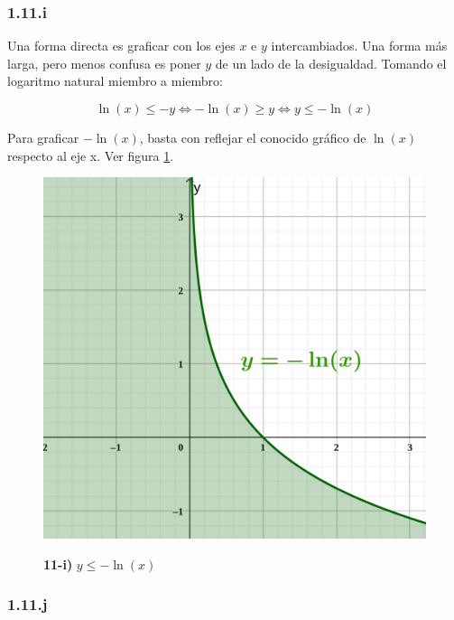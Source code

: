 \documentclass{article}
\begin{document}
\subsubsection*{1.11.i}
\label{subsubsec:1.11.i}

Una forma directa es graficar con los ejes $x$ e $y$ intercambiados. Una forma más larga, pero menos confusa es poner $y$ de un lado de la desigualdad. Tomando el logaritmo natural miembro a miembro:

\begin{equation}
\ln (x) \leq -y \Leftrightarrow -\ln(x) \geq y \Leftrightarrow y \leq -\ln(x)
\end{equation}

Para graficar $-\ln(x)$, basta con reflejar el conocido gráfico de $\ln(x)$ respecto al eje x. Ver figura \ref{fig:1-11-i}.

\begin{figure}[ht]
\caption{\textbf{11-i)} $y \leq -\ln(x)$}
\includegraphics[scale=0.75]{img/ejercicios/1/11-i.png} 
\centering
\label{fig:1-11-i}
\end{figure}

\subsubsection*{1.11.j}
\label{subsubsec:1.11.j}
\end{document}
